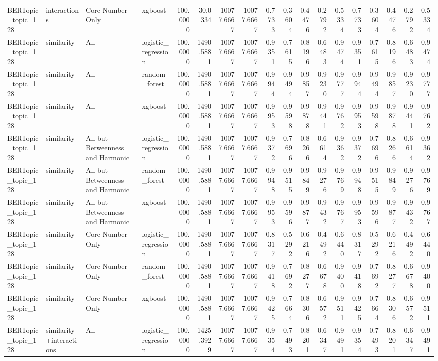 \begin{tabular}{llllrrrrrrrrrrrrrr}
BERTopic_topic_128 & interactions & Core Number Only & xgboost & 100.0000 & 30.0334 & 10077.6667 & 10077.6667 & 0.7733 & 0.3604 & 0.4476 & 0.2792 & 0.5334 & 0.7733 & 0.3604 & 0.4476 & 0.2792 & 0.5334 \\
BERTopic_topic_128 & similarity & All & logistic_regression & 100.0000 & 1490.5881 & 10077.6667 & 10077.6667 & 0.9351 & 0.7615 & 0.8196 & 0.6483 & 0.9474 & 0.9351 & 0.7615 & 0.8196 & 0.6483 & 0.9474 \\
BERTopic_topic_128 & similarity & All & random_forest & 100.0000 & 1490.5881 & 10077.6667 & 10077.6667 & 0.9944 & 0.9494 & 0.9857 & 0.9230 & 0.9777 & 0.9944 & 0.9494 & 0.9857 & 0.9230 & 0.9777 \\
BERTopic_topic_128 & similarity & All & xgboost & 100.0000 & 1490.5881 & 10077.6667 & 10077.6667 & 0.9953 & 0.9598 & 0.9878 & 0.9441 & 0.9762 & 0.9953 & 0.9598 & 0.9878 & 0.9441 & 0.9762 \\
BERTopic_topic_128 & similarity & All but Betweenness and Harmonic & logistic_regression & 100.0000 & 1490.5881 & 10077.6667 & 10077.6667 & 0.9372 & 0.7696 & 0.8266 & 0.6614 & 0.9362 & 0.9372 & 0.7696 & 0.8266 & 0.6614 & 0.9362 \\
BERTopic_topic_128 & similarity & All but Betweenness and Harmonic & random_forest & 100.0000 & 1490.5881 & 10077.6667 & 10077.6667 & 0.9948 & 0.9515 & 0.9849 & 0.9276 & 0.9769 & 0.9948 & 0.9515 & 0.9849 & 0.9276 & 0.9769 \\
BERTopic_topic_128 & similarity & All but Betweenness and Harmonic & xgboost & 100.0000 & 1490.5881 & 10077.6667 & 10077.6667 & 0.9953 & 0.9596 & 0.9877 & 0.9432 & 0.9767 & 0.9953 & 0.9596 & 0.9877 & 0.9432 & 0.9767 \\
BERTopic_topic_128 & similarity & Core Number Only & logistic_regression & 100.0000 & 1490.5881 & 10077.6667 & 10077.6667 & 0.8317 & 0.5292 & 0.6216 & 0.4492 & 0.6440 & 0.8317 & 0.5292 & 0.6216 & 0.4492 & 0.6440 \\
BERTopic_topic_128 & similarity & Core Number Only & random_forest & 100.0000 & 1490.5881 & 10077.6667 & 10077.6667 & 0.9418 & 0.7692 & 0.8277 & 0.6678 & 0.9400 & 0.9418 & 0.7692 & 0.8277 & 0.6678 & 0.9400 \\
BERTopic_topic_128 & similarity & Core Number Only & xgboost & 100.0000 & 1490.5881 & 10077.6667 & 10077.6667 & 0.9425 & 0.7664 & 0.8306 & 0.6572 & 0.9511 & 0.9425 & 0.7664 & 0.8306 & 0.6572 & 0.9511 \\
BERTopic_topic_128 & similarity+interactions & All & logistic_regression & 100.0000 & 1425.3929 & 10077.6667 & 10077.6667 & 0.9354 & 0.7493 & 0.8201 & 0.6347 & 0.9491 & 0.9354 & 0.7493 & 0.8201 & 0.6347 & 0.9491 \\

\end{tabular}
